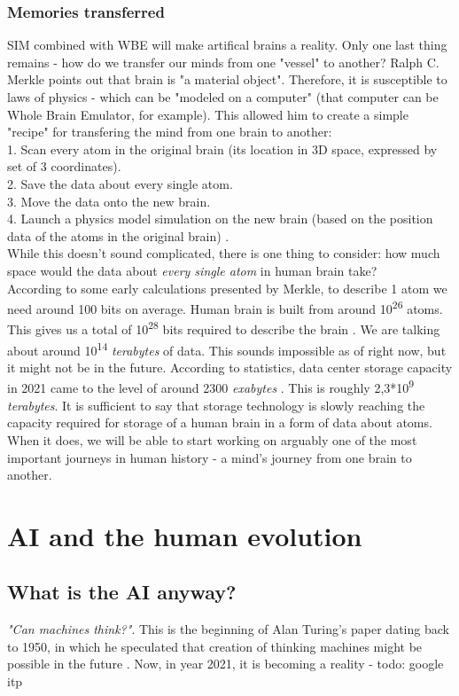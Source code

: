 \documentclass[12pt]{article}
\begin{document}
\subsubsection{Memories transferred}
	SIM combined with WBE will make artifical brains a reality. Only one last thing remains - how do we transfer our minds from one "vessel" to another? Ralph C. Merkle points out that brain is "a material object". Therefore, it is susceptible to laws of physics - which can be "modeled on a computer" \cite{uploading:1} (that computer can be Whole Brain Emulator, for example). This allowed him to create a simple "recipe" for transfering the mind from one brain to another:
	\\1. Scan every atom in the original brain (its location in 3D space, expressed by set of 3 coordinates).
	\\2. Save the data about every single atom.
	\\3. Move the data onto the new brain.
	\\4. Launch a physics model simulation on the new brain (based on the position data of the atoms in the original brain) \cite{uploading:1}.
	\\While this doesn't sound complicated, there is one thing to consider: how much space would the data about \emph{every single atom} in human brain take? 
	\\According to some early calculations presented by Merkle, to describe 1 atom we need around 100 bits on average. Human brain is built from around 10\textsuperscript{26} atoms. This gives us a total of 10\textsuperscript{28} bits required to describe the brain \cite{uploading:1}. We are talking about around 10\textsuperscript{14} \emph{terabytes} of data. This sounds impossible as of right now, but it might not be in the future. According to statistics, data center storage capacity in 2021 came to the level of around 2300 \emph{exabytes} \cite{statista:capacity}. This is roughly 2,3*10\textsuperscript{9} \emph{terabytes}. It is sufficient to say that storage technology is slowly reaching the capacity required for storage of a human brain in a form of data about atoms. When it does, we will be able to start working on arguably one of the most important journeys in human history - a mind's journey from one brain to another.


\section{AI and the human evolution}
\subsection{What is the AI anyway?}
	\emph{"Can machines think?"}. This is the beginning of Alan Turing's paper dating back to 1950, in which he speculated that creation of thinking machines might be possible in the future \cite{turing}. Now, in year 2021, it is becoming a reality - todo: google itp
\end{document}
